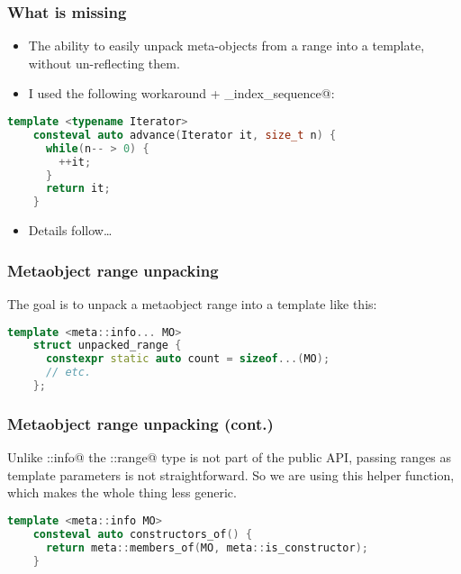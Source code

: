 \documentclass[compress,table,xcolor=table]{beamer}
\begin{document}
\begin{frame}[fragile]
\frametitle{What is missing}
    \Large
    \begin{itemize}
    \item The ability to easily unpack meta-objects from a range into a template,
        without un-reflecting them.
    \item I used the following workaround + \verb@make_index_sequence@:
    \end{itemize}
    \begin{lstlisting}[language=c++]
    template <typename Iterator>
    consteval auto advance(Iterator it, size_t n) {
      while(n-- > 0) {
        ++it;
      }
      return it;
    }
    \end{lstlisting}
    \begin{itemize}
    \item Details follow\ldots
    \end{itemize}
\end{frame}
\begin{frame}[fragile]
\frametitle{Metaobject range unpacking}
  \Large
  The goal is to unpack a metaobject range into a template like this:
    \begin{lstlisting}[language=c++]
    template <meta::info... MO>
    struct unpacked_range {
      constexpr static auto count = sizeof...(MO);
      // etc.
    };
    \end{lstlisting}
\end{frame}
\begin{frame}[fragile]
    \frametitle{Metaobject range unpacking (cont.)}
  \Large
  Unlike \verb@meta::info@ the \verb@detail::range@ type is not part of the
    public API, passing ranges as template parameters is not straightforward.
  \vfill
  So we are using this helper function, which makes the whole thing less generic.
    \begin{lstlisting}[language=c++]
    template <meta::info MO>
    consteval auto constructors_of() {
      return meta::members_of(MO, meta::is_constructor);
    }
    \end{lstlisting}
\end{frame}
\end{document}
